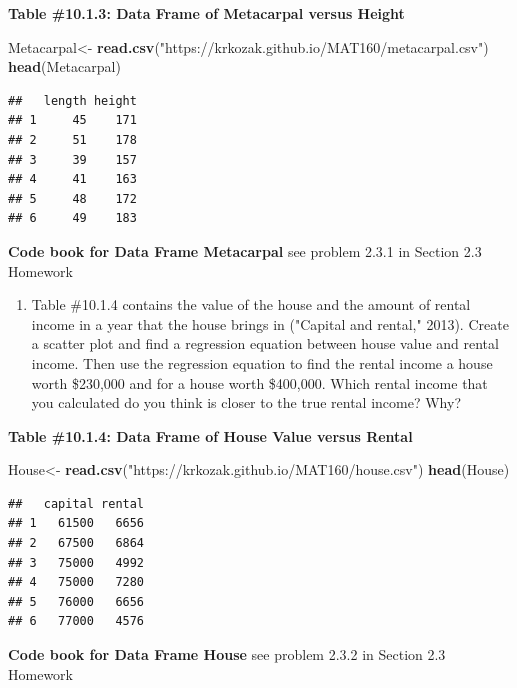 \documentclass[]{book}
\newenvironment{Shaded}{\begin{snugshade}}{\end{snugshade}}
\newcommand{\KeywordTok}[1]{\textcolor[rgb]{0.13,0.29,0.53}{\textbf{#1}}}
\newcommand{\NormalTok}[1]{#1}
\newcommand{\StringTok}[1]{\textcolor[rgb]{0.31,0.60,0.02}{#1}}
\providecommand{\tightlist}{%
  \setlength{\itemsep}{0pt}\setlength{\parskip}{0pt}}
\begin{document}
\textbf{Table \#10.1.3: Data Frame of Metacarpal versus Height}

\begin{Shaded}
\begin{Highlighting}[]
\NormalTok{Metacarpal<-}\StringTok{ }\KeywordTok{read.csv}\NormalTok{(}\StringTok{"https://krkozak.github.io/MAT160/metacarpal.csv"}\NormalTok{)}
\KeywordTok{head}\NormalTok{(Metacarpal)}
\end{Highlighting}
\end{Shaded}

\begin{verbatim}
##   length height
## 1     45    171
## 2     51    178
## 3     39    157
## 4     41    163
## 5     48    172
## 6     49    183
\end{verbatim}

\textbf{Code book for Data Frame Metacarpal} see problem 2.3.1 in Section 2.3 Homework

\begin{enumerate}
\def\labelenumi{\arabic{enumi}.}
\setcounter{enumi}{1}
\tightlist
\item
  Table \#10.1.4 contains the value of the house and the amount of rental income in a year that the house brings in ("Capital and rental," 2013). Create a scatter plot and find a regression equation between house value and rental income. Then use the regression equation to find the rental income a house worth \$230,000 and for a house worth \$400,000. Which rental income that you calculated do you think is closer to the true rental income? Why?
\end{enumerate}

\textbf{Table \#10.1.4: Data Frame of House Value versus Rental}

\begin{Shaded}
\begin{Highlighting}[]
\NormalTok{House<-}\StringTok{ }\KeywordTok{read.csv}\NormalTok{(}\StringTok{"https://krkozak.github.io/MAT160/house.csv"}\NormalTok{)}
\KeywordTok{head}\NormalTok{(House)}
\end{Highlighting}
\end{Shaded}

\begin{verbatim}
##   capital rental
## 1   61500   6656
## 2   67500   6864
## 3   75000   4992
## 4   75000   7280
## 5   76000   6656
## 6   77000   4576
\end{verbatim}

\textbf{Code book for Data Frame House} see problem 2.3.2 in Section 2.3 Homework
\end{document}

